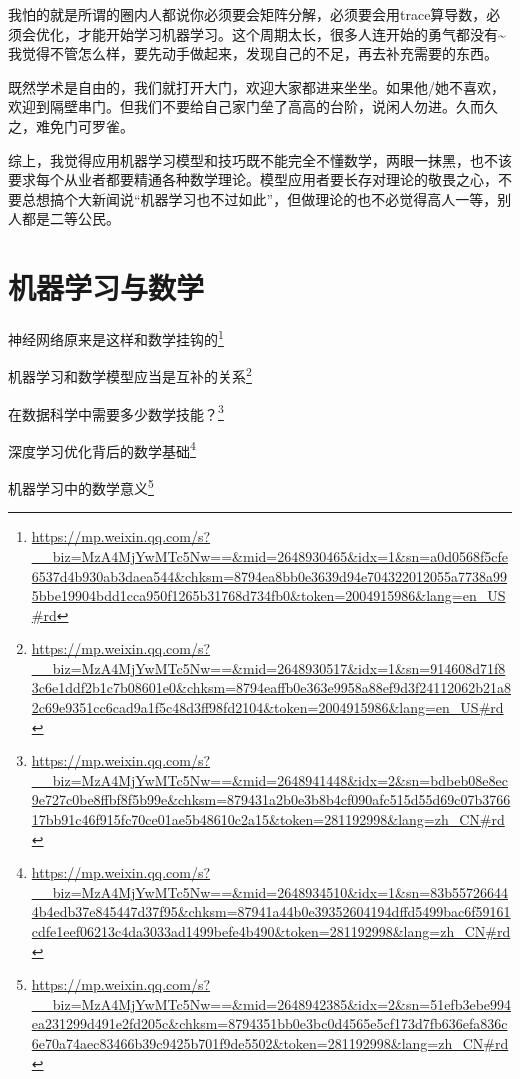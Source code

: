 \documentclass[]{ctexbook}
\renewcommand{\href}[2]{#2\footnote{\url{#1}}}
\begin{document}
我怕的就是所谓的圈内人都说你必须要会矩阵分解，必须要会用trace算导数，必须会优化，才能开始学习机器学习。这个周期太长，很多人连开始的勇气都没有\textasciitilde{}我觉得不管怎么样，要先动手做起来，发现自己的不足，再去补充需要的东西。

既然学术是自由的，我们就打开大门，欢迎大家都进来坐坐。如果他/她不喜欢，欢迎到隔壁串门。但我们不要给自己家门垒了高高的台阶，说闲人勿进。久而久之，难免门可罗雀。

综上，我觉得应用机器学习模型和技巧既不能完全不懂数学，两眼一抹黑，也不该要求每个从业者都要精通各种数学理论。模型应用者要长存对理论的敬畏之心，不要总想搞个大新闻说``机器学习也不过如此''，但做理论的也不必觉得高人一等，别人都是二等公民。

\hypertarget{ux673aux5668ux5b66ux4e60ux4e0eux6570ux5b66}{%
\section{机器学习与数学}\label{ux673aux5668ux5b66ux4e60ux4e0eux6570ux5b66}}

\href{https://mp.weixin.qq.com/s?__biz=MzA4MjYwMTc5Nw==\&mid=2648930465\&idx=1\&sn=a0d0568f5cfe6537d4b930ab3daea544\&chksm=8794ea8bb0e3639d94e704322012055a7738a995bbe19904bdd1cca950f1265b31768d734fb0\&token=2004915986\&lang=en_US\#rd}{神经网络原来是这样和数学挂钩的}

\href{https://mp.weixin.qq.com/s?__biz=MzA4MjYwMTc5Nw==\&mid=2648930517\&idx=1\&sn=914608d71f83c6e1ddf2b1c7b08601e0\&chksm=8794eaffb0e363e9958a88ef9d3f24112062b21a82c69e9351cc6cad9a1f5c48d3ff98fd2104\&token=2004915986\&lang=en_US\#rd}{机器学习和数学模型应当是互补的关系}

\href{https://mp.weixin.qq.com/s?__biz=MzA4MjYwMTc5Nw==\&mid=2648941448\&idx=2\&sn=bdbeb08e8ec9e727c0be8ffbf8f5b99e\&chksm=879431a2b0e3b8b4cf090afc515d55d69c07b376617bb91c46f915fc70ce01ae5b48610c2a15\&token=281192998\&lang=zh_CN\#rd}{在数据科学中需要多少数学技能？}

\href{https://mp.weixin.qq.com/s?__biz=MzA4MjYwMTc5Nw==\&mid=2648934510\&idx=1\&sn=83b557266444b4edb37e845447d37f95\&chksm=87941a44b0e39352604194dffd5499bac6f59161cdfe1eef06213c4da3033ad1499befe4b490\&token=281192998\&lang=zh_CN\#rd}{深度学习优化背后的数学基础}

\href{https://mp.weixin.qq.com/s?__biz=MzA4MjYwMTc5Nw==\&mid=2648942385\&idx=2\&sn=51efb3ebe994ea231299d491e2fd205c\&chksm=8794351bb0e3bc0d4565e5cf173d7fb636efa836c6e70a74aec83466b39c9425b701f9de5502\&token=281192998\&lang=zh_CN\#rd}{机器学习中的数学意义}
\end{document}
